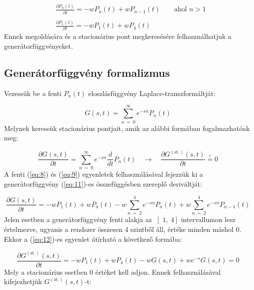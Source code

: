 \begin{align} \label{eq:8}
    &\frac{\partial P_{n} \left( t \right)}{\partial t}
    =
    - w P_{n} \left( t \right) + w P_{n-1} \left( t \right)
    \quad \quad
    \text{ahol $n > 1$}
    \\ \nonumber \\\label{eq:9}
    &\frac{\partial P_{1} \left( t \right)}{\partial t}
    =
    - w P_{1} \left( t \right) + w P_{4} \left( t \right)
\end{align}
Ennek megoldására és a stacionárius pont megkeresésére felhasználhatjuk a generátorfüggvényeket.

\subsection{Generátorfüggvény formalizmus} \label{sub:2.2}
Vezessük be a fenti $P_{n} \left( t \right)$ eloszlásfüggvény Laplace-transzformáltját:

\begin{equation} \label{eq:10}
    G \left( s, t \right)
    =
    \sum_{n\ =\ 0}^{\infty} e^{-sn} P_{n} \left( t \right)
\end{equation}
Melynek keressük stacionárius pontjait, amik az alábbi formában fogalmazhatóak meg:

\begin{equation} \label{eq:11}
    \frac{\partial G \left( s, t \right)}{\partial t}
    =
    \sum_{n\ =\ 0}^{\infty} e^{-sn} \frac{d}{dt} P_{n} \left( t \right)
    \quad \to \quad
    \frac{\partial G^{\left( \text{st.} \right)} \left( s, t \right)}{\partial t}
    \overset{!}{=}
    0
\end{equation}
A fenti (\ref{eq:8}) és (\ref{eq:9}) egyenletek felhasználásával fejezzük ki a generátorfüggvény (\ref{eq:11})-es összefüggésben szereplő deriváltját:

\begin{equation} \label{eq:12}
    \frac{\partial G \left( s, t \right)}{\partial t}
    =
    -
    w P_{1} \left( t \right) + w P_{4} \left( t \right)
    -
    w \sum_{n\ =\ 2}^{4} e^{-sn} P_{n} \left( t \right)
    +
    w \sum_{n\ =\ 2}^{4} e^{-sn} P_{n-1} \left( t \right)
\end{equation}
Jelen esetben a generátorfüggvény fenti alakja az $\left] 1,\ 4 \right]$ intervallumon lesz értelmezve, ugyanis a rendszer összesen 4 szintből áll, értéke minden máshol $0$. Ekkor a (\ref{eq:12})-es egyenlet átírható a következő formába:

\begin{equation} \label{eq:13}
    \frac{\partial G^{\left( \text{st.} \right)} \left( s, t \right)}{\partial t}
    =
    -
    w P_{1} \left( t \right) + w P_{4} \left( t \right)
    -
    w G \left( s, t \right)
    +
    w e^{-s} G \left( s, t \right)
    =
    0
\end{equation}
Mely a stacionárius esetben $0$ értéket kell adjon. Ennek felhasználásával kifejezhetjük $G^{\left( \text{st.} \right)} \left( s, t \right)$-t:

